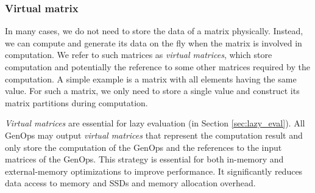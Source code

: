 \subsubsection{Virtual matrix} \label{virt_mat}
In many cases, we do not need to store the data of a matrix physically. Instead,
we can compute and generate its data on the fly when the matrix is involved in
computation. We refer to such matrices as \textit{virtual matrices}, which
store computation and potentially the reference to some other matrices required
by the computation. A simple example is a matrix with
all elements having the same value. For such a matrix, we only need to store
a single value and construct its matrix partitions during computation.

\textit{Virtual matrices} are essential for lazy evaluation (in Section
\ref{sec:lazy_eval}). All GenOps may output \textit{virtual matrices} that
represent the computation result and only store the computation of the GenOps
and the references to the input matrices of the GenOps. This strategy is
essential for both in-memory and external-memory optimizations to improve
performance. It significantly reduces data access to memory and SSDs and
memory allocation overhead.




